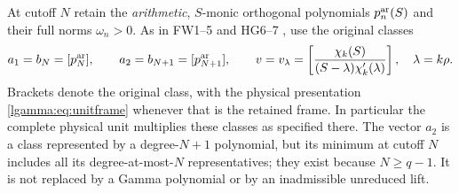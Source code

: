 \documentclass[11pt]{article}
\begin{document}
At cutoff $N$ retain the \emph{arithmetic}, $S$-monic orthogonal
polynomials $p_n^{\rm ar}(S)$ and their full norms $\omega_n>0$.
As in FW1--5 and HG6--7 \cite{lgamma:FW,lgamma:HG}, use the original classes
\begin{equation}\label{lgamma:eq:nativetriple}
 a_1=b_N=[p_N^{\rm ar}],\qquad
 a_2=b_{N+1}=[p_{N+1}^{\rm ar}],\qquad
 v=v_\lambda=\left[\frac{\chi_k(S)}{(S-\lambda)\chi_k'(\lambda)}\right],
 \quad\lambda=k\rho.
\end{equation}
Brackets denote the original class, with the physical presentation
\eqref{lgamma:eq:unitframe} whenever that is the retained frame.  In particular
the complete physical unit multiplies these classes as specified there.
The vector $a_2$ is a class represented by a degree-$N+1$ polynomial,
but its minimum at cutoff $N$ includes all its degree-at-most-$N$
representatives; they exist because $N\ge q-1$.  It is not replaced
by a Gamma polynomial or by an inadmissible unreduced lift.
\end{document}
